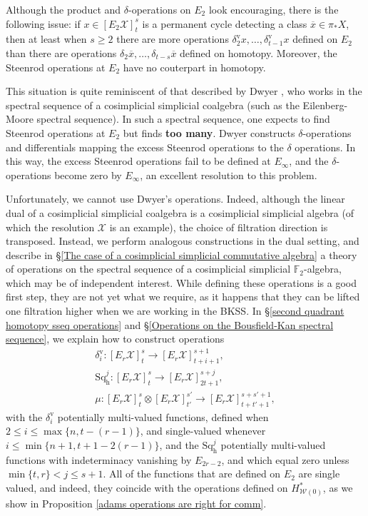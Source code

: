 \documentclass[11pt]{amsart} \renewcommand{\baselinestretch}{1.2}
\theoremstyle{plain}
\numberwithin{equation}{section} %
\theoremstyle{plain}
\numberwithin{equation}{chapter} %
\renewcommand{\to}{\longrightarrow}
\newcommand{\calw}{\mathcal{W}}
\newcommand{\calx}{\mathcal{X}}
\newcommand{\F}{\mathbb{F}}
\newcommand{\E}[5]{[E^{#1}_{#2}#3]^{#4}_{#5}}
\newcommand{\Edownup}[5]{[E_{#1}^{#2}#3]^{#4}_{#5}}
\newcommand{\uver}{^\mathrm{v}}
\newcommand{\dhor}{_\mathrm{h}}
\newcommand{\Sqh}{\mathrm{Sq}\dhor}
\newcommand{\deltav}{\delta\uver}
\newcommand{\BKSS}{BKSS}
\begin{document}
\begin{Introduction}
Although the product and $\delta$-operations on $E_2$ look encouraging, there is the following issue: if $x\in \E{}{2}{\calx}{s}{t}$ is  a permanent cycle detecting  a class $\overline{x}\in \pi_*X$, then at least when $s\geq2$ there are more operations $\deltav_2x,\ldots,\deltav_{t-1}x$ defined on $E_2$ than there are operations $\delta_2\overline{x},\ldots,\delta_{t-s}\overline{x}$ defined on homotopy.  Moreover, the Steenrod operations at $E_2$ have no couterpart in homotopy.

This situation is quite reminiscent of that described by Dwyer \cite{DwyerHigherDividedSquares.pdf}, who works in the spectral sequence of a cosimplicial simplicial coalgebra (such as the Eilenberg-Moore spectral sequence). In such a spectral sequence, one expects to find Steenrod operations at $E_2$ but finds \textbf{too many}. Dwyer constructs $\delta$-operations and differentials mapping the excess Steenrod operations to the $\delta$ operations. In this way, the excess Steenrod operations fail to be defined at $E_\infty$, and the $\delta$-operations become zero by $E_\infty$, an excellent resolution to this problem.

Unfortunately, we cannot use Dwyer's operations. Indeed,  although the linear dual of a cosimplicial simplicial coalgebra is a cosimplicial simplicial algebra (of which the resolution $\calx$ is an example), the choice of filtration direction is transposed. Instead, we perform analogous constructions in the dual setting, and describe in \S\ref{The case of a cosimplicial simplicial commutative algebra} a theory of operations on the spectral sequence of a cosimplicial simplicial $\F_2$-algebra, which may be of independent interest. While defining these operations is a good first step, they are not yet what we require, as it happens that they can be lifted one filtration higher  when we are working in the \BKSS. In \S\ref{second quadrant homotopy sseq operations} and \S\ref{Operations on the Bousfield-Kan spectral sequence}, we explain how to construct operations
\begin{gather*}
\deltav_i:\Edownup{r}{}{\calx}{s}{t} \to \Edownup{r}{}{\calx}{s+1}{t+i+1},
\\
\Sqh^j:\Edownup{r}{}{\calx}{s}{t}   \to
\Edownup{r}{}{\calx}{s+j}{2t+1},\\
\mu:\Edownup{r}{}{\calx}{s}{t}\otimes \Edownup{r}{}{\calx}{s'}{t'}\to
\Edownup{r}{}{\calx}{s+s'+1}{t+t'+1},
\end{gather*}
with the $\deltav_i$ potentially multi-valued functions,  defined when $2\leq i\leq \max\{n,t-(r-1)\}$, and single-valued whenever $i\leq\min\{n+1,t+1-2(r-1)\}$, and the $\Sqh^j$ potentially multi-valued functions with indeterminacy vanishing by $E_{2r-2}$, and which equal zero unless $\min\{t,r\}< j\leq s+1$. All of the functions that are  defined on $E_2$ are single valued, and indeed, they coincide with the operations defined on $H^*_{\calw(0)}$, as we show in Proposition \ref{adams operations are right for comm}.


\end{Introduction}
\end{document}

